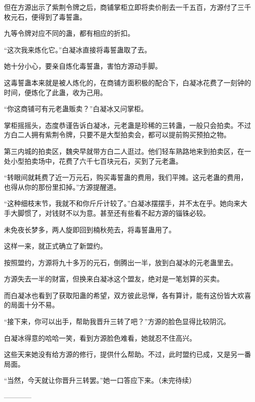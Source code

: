 \begin{this_body}
但在方源出示了紫荆令牌之后，商铺掌柜立即将卖价削去一千五百，方源付了三千枚元石，便得到了毒誓蛊。

九等令牌对应不同的蛊，都有相应的折扣。

“这次我来炼化它。”白凝冰直接将毒誓蛊取了去。

她十分小心，要亲自炼化毒誓蛊，害怕方源动手脚。

这毒誓蛊本来就是被人炼化的，在商铺方面积极的配合下，白凝冰花费了一刻钟的时间，便炼化了此蛊，收为己用。

“你这商铺可有元老蛊贩卖？”白凝冰又问掌柜。

掌柜摇摇头，态度恭谨告诉白凝冰，元老蛊是珍稀的三转蛊，一般只会拍卖。不过方白二人拥有紫荆令牌，只要不是大型拍卖会，都可以提前购买预拍之物。

第三内城的拍卖区，魏央早就带方白二人逛过。他们轻车熟路地来到拍卖区，在一处小型拍卖场中，花费了六千七百块元石，买到了元老蛊。

“转眼间就耗费了近一万元石，购买毒誓蛊的费用，我们平摊。这元老蛊的费用，也得从你的那份里扣掉。”方源提醒道。

“这种细枝末节，我就不和你斤斤计较了。”白凝冰摆摆手，并不太在乎。她向来大手大脚惯了，对钱财不以为意。甚至还有些看不起方源的锱铢必较。

未免夜长梦多，两人旋即回到楠秋苑去，将毒誓蛊用了。

这样一来，就正式确立了新盟约。

按照盟约，方源将九十多万的元石，倒腾出一半，放到白凝冰的元老蛊里去。

方源失去一半的财富，但换来白凝冰这个盟友，绝对是一笔划算的买卖。

而白凝冰也看到了获取阳蛊的希望，双方彼此忌惮，各有算计，能有这份皆大欢喜的局面十分不易。

“接下来，你可以出手，帮助我晋升三转了吧？”方源的脸色显得比较阴沉。

白凝冰得意的哈哈一笑，看到方源脸色难看，她就忍不住高兴。

这些天来她没有给方源的修行，提供什么帮助。不过，此时盟约已成，又是另一番局面。

“当然，今天就让你晋升三转罢。”她一口答应下来。（未完待续）

------------

\end{this_body}

